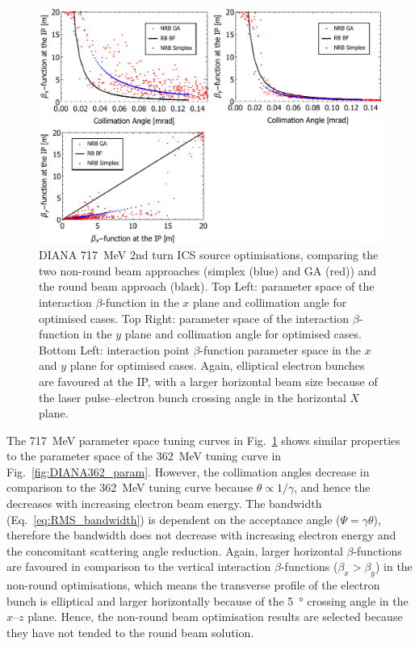 \documentclass[../main.tex]{subfiles}
\begin{document}
\begin{figure}[!h]
\centering
\includegraphics[width=\textwidth]{Figures/DIANA_Inverse_Compton_Source_Design/DIANA717param.pdf}
\caption{DIANA 717~\si{\mega\electronvolt} 2nd turn ICS source optimisations, comparing the two non-round beam approaches (simplex (blue) and GA (red)) and the round beam approach (black). Top Left: parameter space of the interaction $\beta$-function in the $x$ plane and collimation angle for optimised cases. Top Right: parameter space of the interaction $\beta$-function in the $y$ plane and collimation angle for optimised cases. Bottom Left: interaction point $\beta$-function parameter space in the $x$ and $y$ plane for optimised cases. Again, elliptical electron bunches are favoured at the IP, with a larger horizontal beam size because of the laser pulse--electron bunch crossing angle in the horizontal $X$ plane.}
\label{fig:DIANA717_param}
\end{figure}
The 717~\si{\mega\electronvolt} parameter space tuning curves in Fig.~\ref{fig:DIANA717_param} shows similar properties to the parameter space of the 362~\si{\mega\electronvolt} tuning curve in Fig.~\ref{fig:DIANA362_param}. However, the collimation angles decrease in comparison to the 362~\si{\mega\electronvolt} tuning curve because $\theta \propto 1/\gamma$, and hence the decreases with increasing electron beam energy. The bandwidth (Eq.~\ref{eq:RMS_bandwidth}) is dependent on the acceptance angle ($\Psi=\gamma\theta$), therefore the bandwidth does not decrease with increasing electron energy and the concomitant scattering angle reduction. Again, larger horizontal $\beta$-functions are favoured in comparison to the vertical interaction $\beta$-functions ($\beta_{x}>\beta_{y}$) in the non-round optimisations, which means the transverse profile of the electron bunch is elliptical and larger horizontally because of the 5~\si{\degree} crossing angle in the $x$--$z$ plane. Hence, the non-round beam optimisation results are selected because they have not tended to the round beam solution.    
\end{document}
